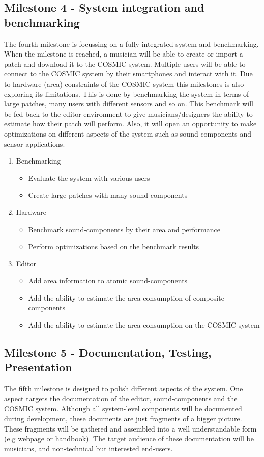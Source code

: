 \subsection{Milestone 4 - System integration and benchmarking}

The fourth milestone is focussing on a fully integrated system and benchmarking.
When the milestone is reached, a musician will be able to create or import a patch and download it to the \ac{COSMIC} system. 
Multiple users will be able to connect to the \ac{COSMIC} system by their smartphones and interact with it. 
Due to hardware (area) constraints of the \ac{COSMIC} system this milestones is also exploring its limitations. 
This is done by benchmarking the system in terms of large patches, many users with different sensors and so on. 
This benchmark will be fed back to the editor environment to give musicians/designers the ability to estimate how their patch will perform. 
Also, it will open an opportunity to make optimizations on different aspects of the system such as sound-components and sensor applications.

	\begin{enumerate}
		\item Benchmarking
			\begin{itemize}
				\item Evaluate the system with various users
				\item Create large patches with many sound-components
			\end{itemize}
		\item Hardware
			\begin{itemize}
				\item Benchmark sound-components by their area and performance
				\item Perform optimizations based on the benchmark results
			\end{itemize}
		\item Editor
			\begin{itemize}
				\item Add area information to atomic sound-components
				\item Add the ability to estimate the area consumption of composite components
				\item Add the ability to estimate the area consumption on the \ac{COSMIC} system
			\end{itemize}
	\end{enumerate}

\subsection{Milestone 5 - Documentation, Testing, Presentation}

The fifth milestone is designed to polish different aspects of the system. 
One aspect targets the documentation of the editor, sound-components and the \ac{COSMIC} system. 
Although all system-level components will be documented during development, these documents are just fragments of a bigger picture. 
These fragments will be gathered and assembled into a well understandable form (e.g webpage or handbook). 
The target audience of these documentation will be musicians, and non-technical but interested end-users.  
